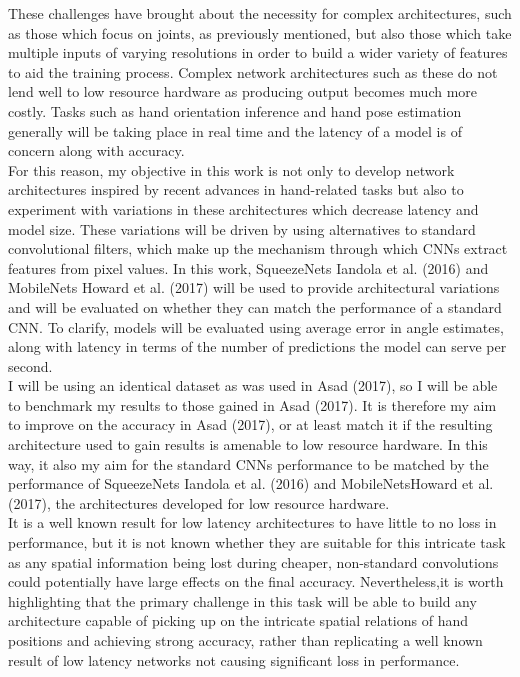 \documentclass{article}
\begin{document}
These challenges have brought about the necessity for complex architectures, such as those which focus on joints, as previously mentioned, but also those which take multiple inputs of varying resolutions in order to build a wider variety of features to aid the training process. Complex network architectures such as these do not lend well to low resource hardware as producing output becomes much more costly. Tasks such as hand orientation inference and hand pose estimation generally will be taking place in real time and the latency of a model is of concern along with accuracy. \\

For this reason, my objective in this work is not only to develop network architectures inspired by recent advances in hand-related tasks but also to experiment with variations in these architectures which decrease latency and model size. These variations will be driven by using alternatives to standard convolutional filters, which make up the mechanism through which CNNs extract features from pixel values. In this work, SqueezeNets Iandola et al. (2016) and MobileNets Howard et al. (2017) will be used to provide architectural variations and will be evaluated on whether they can match the performance of a standard CNN. To clarify, models will be evaluated using average error in angle estimates, along with latency in terms of the number of predictions the model can serve per second.\\

I will be using an identical dataset as was used in Asad (2017), so I will be able to benchmark my results to those gained in Asad (2017). It is therefore my aim to improve on the accuracy in Asad (2017), or at least match it if the resulting architecture used to gain results is amenable to low resource hardware. In this way, it also my aim for the standard CNNs performance to be matched by the performance of SqueezeNets Iandola et al. (2016) and MobileNetsHoward et al. (2017), the architectures developed for low resource hardware. \\

It is a well known result for low latency architectures to have little to no loss in performance, but it is not known whether they are suitable for this intricate task as any spatial information being lost during cheaper, non-standard convolutions could potentially have large effects on the final accuracy. Nevertheless,it is worth highlighting that the primary challenge in this task will be able to build any architecture capable of picking up on the intricate spatial relations of hand positions and achieving strong accuracy, rather than replicating a well known result of low latency networks not causing significant loss in performance. \\
\end{document}
